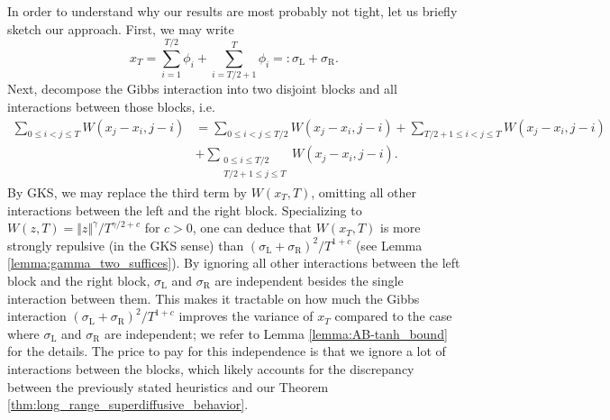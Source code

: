 \documentclass[reqno,11pt]{amsart}
\newcommand{\1}{\mathds{1}}
\theoremstyle{plain}
\theoremstyle{definition}
\numberwithin{equation}{section}
\newcommand{\nn}{\nonumber}
\begin{document}
In order to understand why our results are most probably not tight, let us briefly sketch our approach. First, we may write
$$x_T = \sum\limits_{i=1} ^{T/2} \phi_i + \sum\limits_{i=T/2 +1} ^{T} \phi_i =: \sigma_\mathrm L + \sigma_\mathrm R.$$
Next, decompose the Gibbs interaction into two disjoint blocks and all interactions between those blocks, i.e.
\begin{equation}
    \nn
    \begin{split}
        \sum\limits_{0 \le i< j \le T} W( x_j - x_i , j-i ) &= \sum\limits_{0 \le i < j \le T/2} W( x_j - x_i , j-i ) + \sum\limits_{T/2 + 1 \le i < j \le T} W( x_j - x_i , j-i )  \\
        &+ \sum_{\substack{
0 \le i \le T/2 \\
T/2 + 1 \le j \le T
}}
 W( x_j - x_i , j-i ).
    \end{split}
\end{equation}
By GKS, we may replace 
the third term by $W(x_T,T)$, omitting all other interactions between the left and the right block. 
 Specializing to $W(z,T) = \Vert z \Vert^\gamma / T^{\gamma/2 + c}$ for $c>0$, one can deduce that $W(x_T,T)$ is more strongly repulsive (in the GKS sense) than $(\sigma_\mathrm L + \sigma_\mathrm R) ^2 /T^{1+c}$ (see Lemma \ref{lemma:gamma_two_suffices}). 
 By ignoring all other interactions between the left block and the right block, $\sigma_\mathrm L$ and $\sigma_\mathrm R$ are independent besides the single interaction between them. This makes it tractable on how much the Gibbs interaction $(\sigma_\mathrm L + \sigma_\mathrm R) ^2 /T^{1+c}$ improves the variance of $x_T$ compared to the case where $\sigma_\mathrm L$ and  $\sigma_\mathrm R$ are independent; we refer to Lemma \ref{lemma:AB-tanh_bound} for the details. The price to pay for this independence is that we ignore a lot of interactions between the blocks, which likely accounts for the discrepancy between the previously stated heuristics and our Theorem \ref{thm:long_range_superdiffusive_behavior}.
\end{document}

